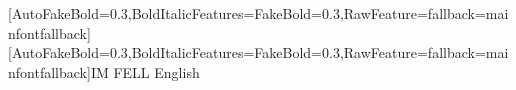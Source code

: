 \setmainfont{IM FELL English}[AutoFakeBold=0.3,BoldItalicFeatures={FakeBold=0.3},RawFeature={fallback=mainfontfallback}]
[AutoFakeBold=0.3,BoldItalicFeatures={FakeBold=0.3},RawFeature={fallback=mainfontfallback}]{IM FELL English}